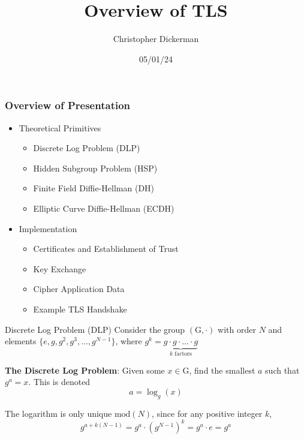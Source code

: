 \documentclass{beamer}
\title{Overview of TLS}
\author{Christopher Dickerman}
\date{05/01/24}
\begin{document}
\frame{\titlepage}

\begin{frame}
\frametitle{Overview of Presentation}
\begin{itemize}
    \item Theoretical Primitives
    \begin{itemize}
        \item Discrete Log Problem (DLP)
        \item Hidden Subgroup Problem (HSP)
        \item Finite Field Diffie-Hellman (DH)
        \item Elliptic Curve Diffie-Hellman (ECDH)
    \end{itemize}
    \item Implementation
    \begin{itemize}
        \item Certificates and Establishment of Trust
        \item Key Exchange
        \item Cipher Application Data
        \item Example TLS Handshake
    \end{itemize}
\end{itemize}
\end{frame}
\begin{frame}{Discrete Log Problem (DLP)}
    Consider the group $(\mathrm{G}, \cdot)$ with order $N$ and elements $\{e, g, g^2, g^3, ..., g^{N-1}\}$, where $g^k = \underbrace{g \cdot g \cdot ... \cdot g}_{k \text{ factors} }$ 
    \newline
    
    \textbf{The Discrete Log Problem}: Given some $x \in \mathrm{G}$, find the smallest $a$ such that $g^a = x$. This is denoted
    \[
        a = \log_{g}(x)
    \]
    
    The logarithm is only unique $\mathrm{mod}(N)$, since for any positive integer $k$,
    \[
        g^{a+k(N-1)} = g^{a}\cdot (g^{N-1})^k = g^a\cdot e = g^a
    \]
    
\end{frame}
\end{document}
